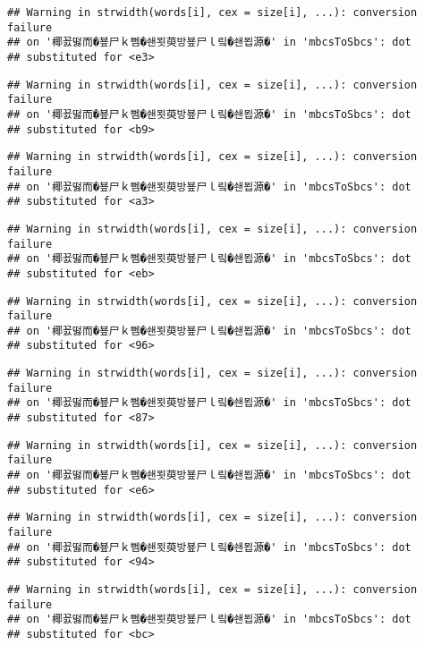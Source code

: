 \documentclass[]{article}
\begin{document}
\begin{verbatim}
## Warning in strwidth(words[i], cex = size[i], ...): conversion failure
## on '椰꾨떯而�뵾尸ｋ뻼�쇈묏萸방뵾尸ｌ맄�쇈묍源�' in 'mbcsToSbcs': dot
## substituted for <e3>
\end{verbatim}

\begin{verbatim}
## Warning in strwidth(words[i], cex = size[i], ...): conversion failure
## on '椰꾨떯而�뵾尸ｋ뻼�쇈묏萸방뵾尸ｌ맄�쇈묍源�' in 'mbcsToSbcs': dot
## substituted for <b9>
\end{verbatim}

\begin{verbatim}
## Warning in strwidth(words[i], cex = size[i], ...): conversion failure
## on '椰꾨떯而�뵾尸ｋ뻼�쇈묏萸방뵾尸ｌ맄�쇈묍源�' in 'mbcsToSbcs': dot
## substituted for <a3>
\end{verbatim}

\begin{verbatim}
## Warning in strwidth(words[i], cex = size[i], ...): conversion failure
## on '椰꾨떯而�뵾尸ｋ뻼�쇈묏萸방뵾尸ｌ맄�쇈묍源�' in 'mbcsToSbcs': dot
## substituted for <eb>
\end{verbatim}

\begin{verbatim}
## Warning in strwidth(words[i], cex = size[i], ...): conversion failure
## on '椰꾨떯而�뵾尸ｋ뻼�쇈묏萸방뵾尸ｌ맄�쇈묍源�' in 'mbcsToSbcs': dot
## substituted for <96>
\end{verbatim}

\begin{verbatim}
## Warning in strwidth(words[i], cex = size[i], ...): conversion failure
## on '椰꾨떯而�뵾尸ｋ뻼�쇈묏萸방뵾尸ｌ맄�쇈묍源�' in 'mbcsToSbcs': dot
## substituted for <87>
\end{verbatim}

\begin{verbatim}
## Warning in strwidth(words[i], cex = size[i], ...): conversion failure
## on '椰꾨떯而�뵾尸ｋ뻼�쇈묏萸방뵾尸ｌ맄�쇈묍源�' in 'mbcsToSbcs': dot
## substituted for <e6>
\end{verbatim}

\begin{verbatim}
## Warning in strwidth(words[i], cex = size[i], ...): conversion failure
## on '椰꾨떯而�뵾尸ｋ뻼�쇈묏萸방뵾尸ｌ맄�쇈묍源�' in 'mbcsToSbcs': dot
## substituted for <94>
\end{verbatim}

\begin{verbatim}
## Warning in strwidth(words[i], cex = size[i], ...): conversion failure
## on '椰꾨떯而�뵾尸ｋ뻼�쇈묏萸방뵾尸ｌ맄�쇈묍源�' in 'mbcsToSbcs': dot
## substituted for <bc>
\end{verbatim}
\end{document}
